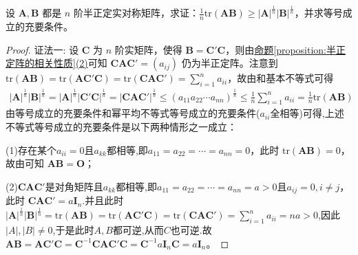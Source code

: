 \documentclass[../../main.tex]{subfiles}
\begin{document}
\begin{proposition}\label{proposition:半正定阵的迹与行列式相关不等式}
设 \(\boldsymbol{A},\boldsymbol{B}\) 都是 \(n\) 阶半正定实对称矩阵，求证：\(\frac{1}{n}\mathrm{tr}(\boldsymbol{A}\boldsymbol{B})\geqslant |\boldsymbol{A}|^{\frac{1}{n}}|\boldsymbol{B}|^{\frac{1}{n}}\)，并求等号成立的充要条件。
\end{proposition}
\begin{proof}
{\color{blue}证法一:}
设 \(\boldsymbol{C}\) 为 \(n\) 阶实矩阵，使得 \(\boldsymbol{B}=\boldsymbol{C}'\boldsymbol{C}\)，则由\hyperref[proposition:半正定阵的相关性质]{命题\ref{proposition:半正定阵的相关性质}(2)}可知 \(\boldsymbol{C}\boldsymbol{A}\boldsymbol{C}'=(a_{ij})\) 仍为半正定阵。注意到 \(\mathrm{tr}(\boldsymbol{A}\boldsymbol{B})=\mathrm{tr}(\boldsymbol{A}\boldsymbol{C}'\boldsymbol{C})=\mathrm{tr}(\boldsymbol{C}\boldsymbol{A}\boldsymbol{C}')=\sum_{i = 1}^{n}a_{ii}\)，故由和基本不等式可得
\begin{align*}
|\boldsymbol{A}|^{\frac{1}{n}}|\boldsymbol{B}|^{\frac{1}{n}}=|\boldsymbol{A}|^{\frac{1}{n}}|\boldsymbol{C}'\boldsymbol{C}|^{\frac{1}{n}}=|\boldsymbol{C}\boldsymbol{A}\boldsymbol{C}'|^{\frac{1}{n}}\leqslant (a_{11}a_{22}\cdots a_{nn})^{\frac{1}{n}}\leqslant \frac{1}{n}\sum_{i = 1}^{n}a_{ii}=\frac{1}{n}\mathrm{tr}(\boldsymbol{A}\boldsymbol{B})
\end{align*}
由等号成立的充要条件和幂平均不等式等号成立的充要条件($a_{ii}$全相等)可得,上述不等式等号成立的充要条件是以下两种情形之一成立：

(1)存在某个$a_{ii}=0$且$a_{kk}$都相等,即\(a_{11}=a_{22}=\cdots=a_{nn}=0\)，此时 \(\mathrm{tr}(\boldsymbol{A}\boldsymbol{B}) = 0\)，故由可知 \(\boldsymbol{A}\boldsymbol{B}=\boldsymbol{O}\)；

(2)$\boldsymbol{C}\boldsymbol{A}\boldsymbol{C}'$是对角矩阵且$a_{kk}$都相等,即\(a_{11}=a_{22}=\cdots=a_{nn}=a>0\)且$a_{ij}=0,i\ne j$，此时
\(\boldsymbol{C}\boldsymbol{A}\boldsymbol{C}'=a\boldsymbol{I}_n\).并且此时\(|\boldsymbol{A}|^{\frac{1}{n}}|\boldsymbol{B}|^{\frac{1}{n}}=\mathrm{tr}(\boldsymbol{A}\boldsymbol{B})=\mathrm{tr}(\boldsymbol{A}\boldsymbol{C}'\boldsymbol{C})=\mathrm{tr}(\boldsymbol{C}\boldsymbol{A}\boldsymbol{C}')=\sum_{i = 1}^{n}a_{ii}=na>0\),因此$|A|,|B|\ne0$,于是此时$A,B$都可逆,从而$C$也可逆.故 \(\boldsymbol{AB}=\boldsymbol{AC}' \boldsymbol{C}=\boldsymbol{C}^{-1}\boldsymbol{CAC}' \boldsymbol{C}=\boldsymbol{C}^{-1}a\boldsymbol{I}_n\boldsymbol{C}=a\boldsymbol{I}_n\)。


\end{proof}
\end{document}
